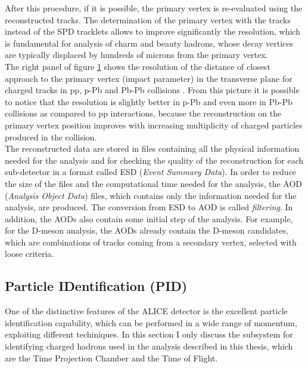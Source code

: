 \documentclass[b5paper,10pt,twoside,oldstyle,classica]{toptesi}
\begin{document}
\begin{figure}[tb]
\begin{center}
\label{tracking}
\end{center}
\end{figure} After this procedure, if it is possible, the primary vertex is re-evaluated using the reconstructed tracks. The determination of the primary vertex with the tracks instead of the SPD tracklets allows to improve significantly the resolution, which is fundamental for analysis of charm and beauty hadrons, whose decay vertices are typically displaced by hundreds of microns from the primary vertex.\\
The right panel of figure \ref{tracking} shows the resolution of the distance of closest approach to the primary vertex (impact parameter) in the transverse plane for charged tracks in pp, p-Pb and Pb-Pb collisions \cite{Abelev:2014ffa}. From this picture it is possible to notice that the resolution is slightly better in p-Pb and even more in Pb-Pb collisions as compared to pp interactions, because the reconstruction on the primary vertex position improves with increasing multiplicity of charged particles produced in the collision.\\
The reconstructed data are stored in files containing all the physical information needed for the analysis and for checking the quality of the reconstruction for each sub-detector in a format called ESD (\textit{Event Summary Data}). In order to reduce the size of the files and the computational time needed for the analysis, the AOD (\textit{Analysis Object Data}) files, which contains only the information needed for the analysis, are produced. The conversion from ESD to AOD is called \textit{filtering}. In addition, the AODs also contain some initial step of the analysis. For example, for the D-meson analysis, the AODs already contain the D-meson candidates, which are combinations of tracks coming from a secondary vertex, selected with loose criteria.   
\subsection{Particle IDentification (PID)}
\label{PID_sec} 
One of the distinctive features of the ALICE detector is the excellent particle identification capability, which can be performed in a wide range of momentum, exploiting different techiniques. In this section I only discuss the subsystem for identifying charged hadrons  used in the analysis described in this thesis, which are the Time Projection Chamber and the Time of Flight. 
\end{document}
